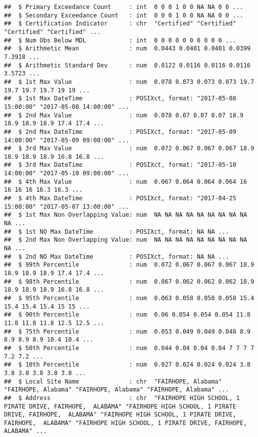 \documentclass[]{article}
\begin{document}
\begin{verbatim}
##  $ Primary Exceedance Count     : int  0 0 0 1 0 0 NA NA 0 0 ...
##  $ Secondary Exceedance Count   : int  0 0 0 1 0 0 NA NA 0 0 ...
##  $ Certification Indicator      : chr  "Certified" "Certified" "Certified" "Certified" ...
##  $ Num Obs Below MDL            : int  0 0 0 0 0 0 0 0 0 0 ...
##  $ Arithmetic Mean              : num  0.0443 0.0401 0.0401 0.0399 7.3918 ...
##  $ Arithmetic Standard Dev      : num  0.0122 0.0116 0.0116 0.0116 3.5723 ...
##  $ 1st Max Value                : num  0.078 0.073 0.073 0.073 19.7 19.7 19.7 19.7 19 19 ...
##  $ 1st Max DateTime             : POSIXct, format: "2017-05-08 15:00:00" "2017-05-08 14:00:00" ...
##  $ 2nd Max Value                : num  0.078 0.07 0.07 0.07 18.9 18.9 18.9 18.9 17.4 17.4 ...
##  $ 2nd Max DateTime             : POSIXct, format: "2017-05-09 14:00:00" "2017-05-09 09:00:00" ...
##  $ 3rd Max Value                : num  0.072 0.067 0.067 0.067 18.9 18.9 18.9 18.9 16.8 16.8 ...
##  $ 3rd Max DateTime             : POSIXct, format: "2017-05-10 14:00:00" "2017-05-10 09:00:00" ...
##  $ 4th Max Value                : num  0.067 0.064 0.064 0.064 16 16 16 16 16.3 16.3 ...
##  $ 4th Max DateTime             : POSIXct, format: "2017-04-25 15:00:00" "2017-05-07 13:00:00" ...
##  $ 1st Max Non Overlapping Value: num  NA NA NA NA NA NA NA NA NA NA ...
##  $ 1st NO Max DateTime          : POSIXct, format: NA NA ...
##  $ 2nd Max Non Overlapping Value: num  NA NA NA NA NA NA NA NA NA NA ...
##  $ 2nd NO Max DateTime          : POSIXct, format: NA NA ...
##  $ 99th Percentile              : num  0.072 0.067 0.067 0.067 18.9 18.9 18.9 18.9 17.4 17.4 ...
##  $ 98th Percentile              : num  0.067 0.062 0.062 0.062 18.9 18.9 18.9 18.9 16.8 16.8 ...
##  $ 95th Percentile              : num  0.063 0.058 0.058 0.058 15.4 15.4 15.4 15.4 15 15 ...
##  $ 90th Percentile              : num  0.06 0.054 0.054 0.054 11.8 11.8 11.8 11.8 12.5 12.5 ...
##  $ 75th Percentile              : num  0.053 0.049 0.049 0.048 8.9 8.9 8.9 8.9 10.4 10.4 ...
##  $ 50th Percentile              : num  0.044 0.04 0.04 0.04 7 7 7 7 7.2 7.2 ...
##  $ 10th Percentile              : num  0.027 0.024 0.024 0.024 3.8 3.8 3.8 3.8 3.8 3.8 ...
##  $ Local Site Name              : chr  "FAIRHOPE, Alabama" "FAIRHOPE, Alabama" "FAIRHOPE, Alabama" "FAIRHOPE, Alabama" ...
##  $ Address                      : chr  "FAIRHOPE HIGH SCHOOL, 1 PIRATE DRIVE, FAIRHOPE,  ALABAMA" "FAIRHOPE HIGH SCHOOL, 1 PIRATE DRIVE, FAIRHOPE,  ALABAMA" "FAIRHOPE HIGH SCHOOL, 1 PIRATE DRIVE, FAIRHOPE,  ALABAMA" "FAIRHOPE HIGH SCHOOL, 1 PIRATE DRIVE, FAIRHOPE,  ALABAMA" ...

\end{verbatim}
\end{document}
